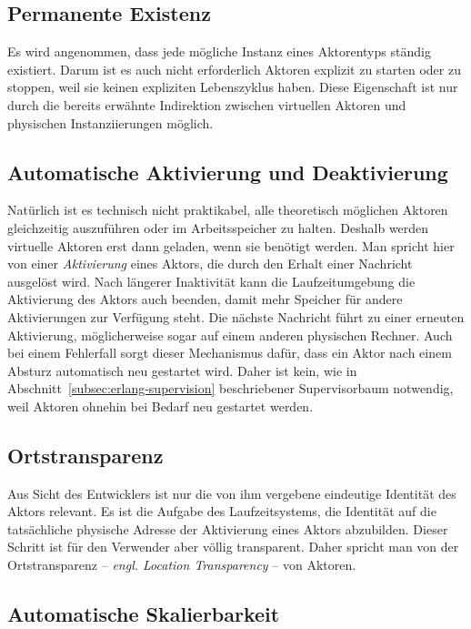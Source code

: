 \subsection{Permanente Existenz}

Es wird angenommen, dass jede mögliche Instanz eines Aktorentyps ständig existiert. Darum ist es auch nicht erforderlich Aktoren explizit zu starten oder zu stoppen, weil sie keinen expliziten Lebenszyklus haben. Diese Eigenschaft ist nur durch die bereits erwähnte Indirektion zwischen virtuellen Aktoren und physischen Instanziierungen möglich.

\subsection{Automatische Aktivierung und Deaktivierung}

Natürlich ist es technisch nicht praktikabel, alle theoretisch möglichen Aktoren gleichzeitig auszuführen oder im Arbeitsspeicher zu halten. Deshalb werden virtuelle Aktoren erst dann geladen, wenn sie benötigt werden. Man spricht hier von einer \textit{Aktivierung} eines Aktors, die \zB durch den Erhalt einer Nachricht ausgelöst wird. Nach längerer Inaktivität kann die Laufzeitumgebung die Aktivierung des Aktors auch beenden, damit mehr Speicher für andere Aktivierungen zur Verfügung steht. Die nächste Nachricht führt zu einer erneuten Aktivierung, möglicherweise sogar auf einem anderen physischen Rechner. Auch bei einem Fehlerfall sorgt dieser Mechanismus dafür, dass ein Aktor nach einem Absturz automatisch neu gestartet wird. Daher ist kein, wie in Abschnitt~\ref{subsec:erlang-supervision} beschriebener Supervisorbaum notwendig, weil Aktoren ohnehin bei Bedarf neu gestartet werden.

\subsection{Ortstransparenz}

Aus Sicht des Entwicklers ist nur die von ihm vergebene eindeutige Identität des Aktors relevant. Es ist die Aufgabe des Laufzeitsystems, die Identität auf die tatsächliche physische Adresse der Aktivierung eines Aktors abzubilden. Dieser Schritt ist für den Verwender aber völlig transparent. Daher spricht man von der Ortstransparenz -- \textit{engl. Location Transparency} -- von Aktoren.

\subsection{Automatische Skalierbarkeit}


